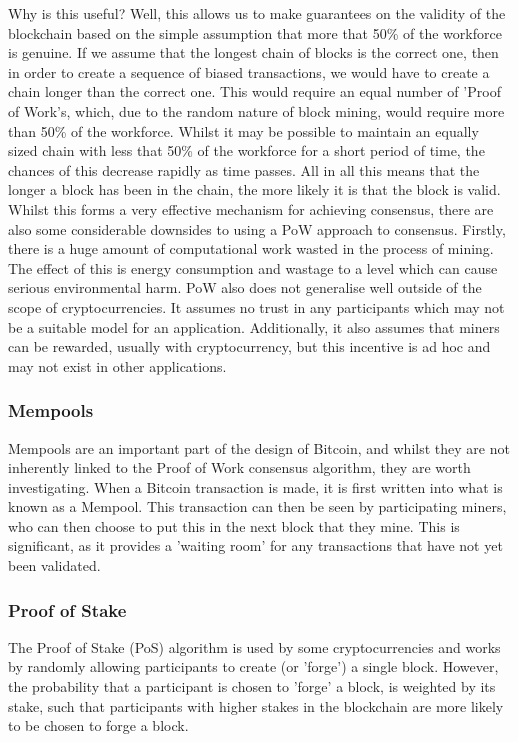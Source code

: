 \documentclass[12pt,a4paper,twoside,openright]{report}
\begin{document}
			Why is this useful? 
			Well, this allows us to make guarantees on the validity of the blockchain based on the simple assumption that more that 50\% of the workforce is genuine.
			If we assume that the longest chain of blocks is the correct one, then in order to create a sequence of biased transactions, we would have to create a chain longer than the correct one. 
			This would require an equal number of 'Proof of Work's, which, due to the random nature of block mining, would require more than 50\% of the workforce.
			Whilst it may be possible to maintain an equally sized chain with less that 50\% of the workforce for a short period of time, the chances of this decrease rapidly as time passes.
			All in all this means that the longer a block has been in the chain, the more likely it is that the block is valid.\\

			Whilst this forms a very effective mechanism for achieving consensus, there are also some considerable downsides to using a PoW approach to consensus. 
			Firstly, there is a huge amount of computational work wasted in the process of mining. 
			The effect of this is energy consumption \cite{BitcoinEnergy} and wastage to a level which can cause serious environmental harm.
			PoW also does not generalise well outside of the scope of cryptocurrencies.
			It assumes no trust in any participants which may not be a suitable model for an application. 
			Additionally, it also assumes that miners can be rewarded, usually with cryptocurrency, but this incentive is ad hoc and may not exist in other applications.
			
			\subsubsection*{Mempools}
			Mempools are an important part of the design of Bitcoin, and whilst they are not inherently linked to the Proof of Work consensus algorithm, they are worth investigating. 
			When a Bitcoin transaction is made, it is first written into what is known as a Mempool. 
			This transaction can then be seen by participating miners, who can then choose to put this in the next block that they mine. 
			This is significant, as it provides a 'waiting room' for any transactions that have not yet been validated.  

			\subsubsection*{Proof of Stake}
			The Proof of Stake (PoS) algorithm is used by some cryptocurrencies and works by randomly allowing participants to create (or 'forge') a single block.
			However, the probability that a participant is chosen to 'forge' a block, is weighted by its stake, such that participants with higher stakes in the blockchain are more likely to be chosen to forge a block.\\
\end{document}
